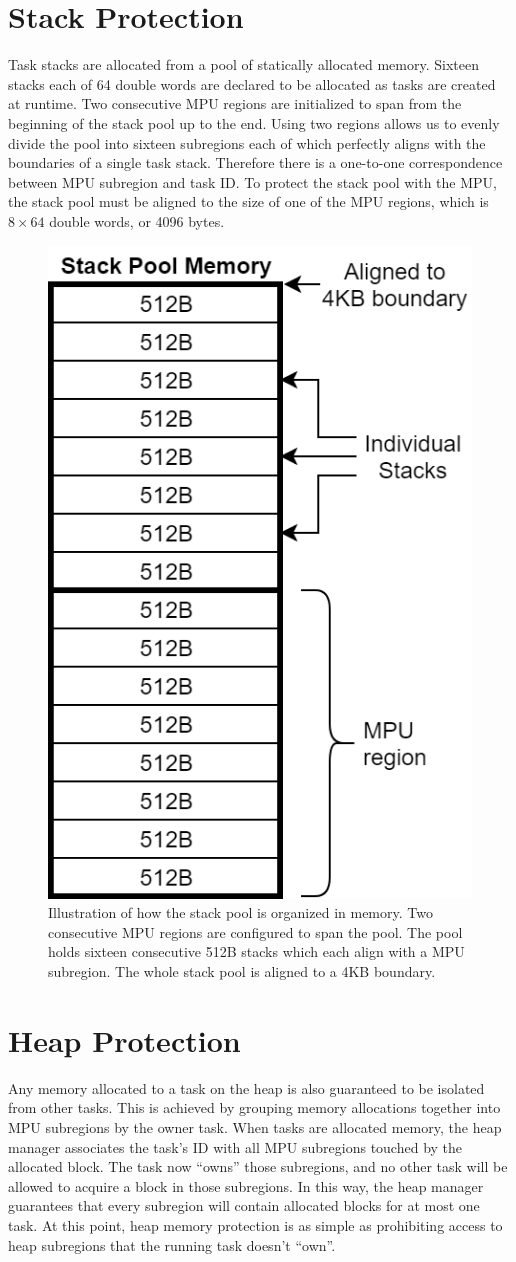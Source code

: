 \section{Stack Protection}

Task stacks are allocated from a pool of statically allocated memory. Sixteen stacks each of 64 double words are declared to be allocated as tasks are created at runtime. Two consecutive MPU regions are initialized to span from the beginning of the stack pool up to the end. Using two regions allows us to evenly divide the pool into sixteen subregions each of which perfectly aligns with the boundaries of a single task stack. Therefore there is a one-to-one correspondence between MPU subregion and task ID. To protect the stack pool with the MPU, the stack pool must be aligned to the size of one of the MPU regions, which is $8\times64$ double words, or 4096 bytes.

\begin{figure}[hbtp]
	\centering
	\includegraphics[width=0.4\columnwidth]{figs/stack_prot.png}
	\caption{Illustration of how the stack pool is organized in memory. Two consecutive MPU regions are configured to span the pool. The pool holds sixteen consecutive 512B stacks which each align with a MPU subregion. The whole stack pool is aligned to a 4KB boundary.}
	\label{fig:stack_prot}
\end{figure}

\section{Heap Protection}

Any memory allocated to a task on the heap is also guaranteed to be isolated from other tasks. This is achieved by grouping memory allocations together into MPU subregions by the owner task. When tasks are allocated memory, the heap manager associates the task's ID with all MPU subregions touched by the allocated block. The task now ``owns'' those subregions, and no other task will be allowed to acquire a block in those subregions. In this way, the heap manager guarantees that every subregion will contain allocated blocks for at most one task. At this point, heap memory protection is as simple as prohibiting access to heap subregions that the running task doesn't ``own''.

